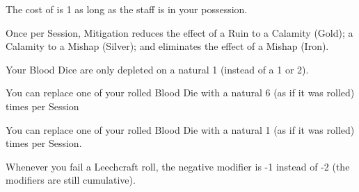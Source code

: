 
The \TARGET cost of  is 1 as long as the staff is in your possession.



Once per Session, Mitigation reduces the effect of a Ruin to a Calamity (Gold); a Calamity to a Mishap (Silver); and eliminates the effect of a Mishap (Iron).


Your Blood Dice are only depleted on a natural 1 (instead of a 1 or 2). 



You can replace one of your rolled Blood Die with a natural 6 (as if it was rolled) \NUM times per Session  

 


You can replace one of your rolled Blood Die with a natural 1 (as if it was rolled) \NUM times per Session.


Whenever you fail a Leechcraft roll, the negative modifier is -1 instead of -2 (the modifiers are still cumulative).

\newpage
